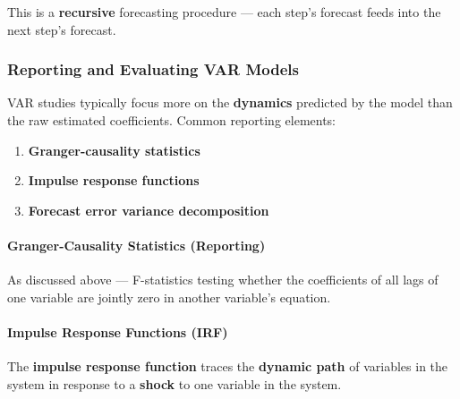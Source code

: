 \documentclass[12pt,openany]{book}
\begin{document}
\begin{center}
\end{center}


This is a \textbf{recursive} forecasting procedure --- each step's forecast feeds into the next step's forecast.

\subsubsection{Reporting and Evaluating VAR Models}

VAR studies typically focus more on the \textbf{dynamics} predicted by the model than the raw estimated coefficients. Common reporting elements:

\begin{enumerate}[leftmargin=*]
    \item \textbf{Granger-causality statistics}
    \item \textbf{Impulse response functions}
    \item \textbf{Forecast error variance decomposition}
\end{enumerate}

\paragraph{Granger-Causality Statistics (Reporting)}

As discussed above --- F-statistics testing whether the coefficients of all lags of one variable are jointly zero in another variable's equation.

\paragraph{Impulse Response Functions (IRF)}

The \textbf{impulse response function} traces the \textbf{dynamic path} of variables in the system in response to a \textbf{shock} to one variable in the system.
\end{document}
